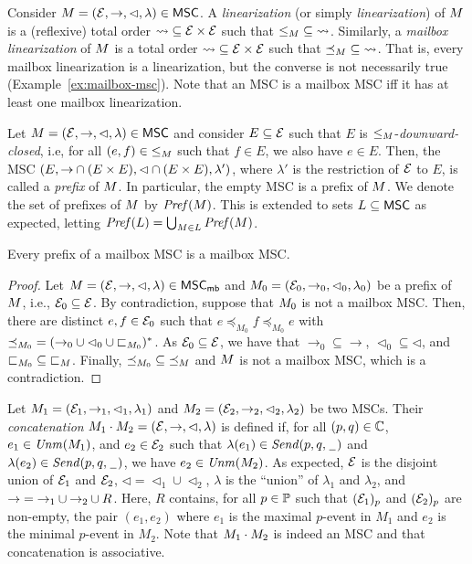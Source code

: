 \documentclass{article}
\begin{document}
Consider $M = (\mathcal{E},\to,\lhd,\lambda) \in \mathsf{MSC}$.
A \emph{\pp linearization} (or simply \emph{linearization}) of $M$ is a (reflexive) total order
${\rightsquigarrow} \subseteq \mathcal{E} \times \mathcal{E}$ such that ${\le_M} \subseteq
{\rightsquigarrow}$. Similarly,
a \emph{mailbox linearization} of $M$ is a total order
${\rightsquigarrow} \subseteq \mathcal{E} \times \mathcal{E}$ such that ${\preceq_M} \subseteq
{\rightsquigarrow}$. That is, every mailbox linearization is a \pp linearization,
but the converse is not necessarily true (Example~\ref{ex:mailbox-msc}).
Note that an MSC is a mailbox MSC iff it has at least one mailbox linearization.

\medskip

Let $M = (\mathcal{E},\to,\lhd,\lambda) \in \mathsf{MSC}$ and consider
$E \subseteq \mathcal{E}$ such that $E$ is ${\le_M}$-\emph{downward-closed}, i.e,
for all $(e,f) \in {\le_M}$ such that $f \in E$, we also have $e \in E$.
Then, the MSC $(E,{\to} \cap (E \times E),{\lhd} \cap (E \times E),\lambda')$,
where $\lambda'$ is the restriction of $\mathcal{E}$ to $E$, is called a \emph{prefix}
of $M$. In particular, the empty MSC is a prefix of $M$.
We denote the set of prefixes of $M$ by $\mathit{Pref}(M)$.
This is extended to sets $L \subseteq \mathsf{MSC}$ as expected, letting
$\mathit{Pref}(L) = \bigcup_{M \in L} \mathit{Pref}(M)$.

\begin{lemma}
\label{lem:mb-prefix}
Every prefix of a mailbox MSC is a mailbox MSC.
\end{lemma}
\begin{proof}
Let $M = (\mathcal{E}, \to, \lhd, \lambda) \in \mathsf{MSC}_{\mathsf{mb}}$ and $M_0 =
(\mathcal{E}_0, \to_0, \lhd_0, \lambda_0)$ be a prefix of $M$, i.e.,
$\mathcal{E}_0 \subseteq \mathcal{E}$. By contradiction, suppose that $M_0$ is not a
mailbox MSC. Then, there are distinct $e,f \in \mathcal{E}_0$ such that $e \preceq_{M_0} f \preceq_{M_0}
e$ with ${\preceq_{M_0}} = ({\rightarrow_0} \cup {\lhd_0} \cup {\sqsubset_{M_0}})^*$.
As $\mathcal{E}_0 \subseteq \mathcal{E}$, we have that ${\rightarrow_0} \subseteq {\rightarrow}$, ${\lhd_0} \subseteq {\lhd}$, and ${\sqsubset_{M_0}} \subseteq {\sqsubset_{M}}$. Finally, ${\preceq_{M_0}} \subseteq {\preceq_{M}}$ and $M$ is not a mailbox MSC, which is a contradiction.
\end{proof}

Let $M_1 = (\mathcal{E}_1,\to_1,\lhd_1,\lambda_1)$ and
$M_2 = (\mathcal{E}_2,\to_2,\lhd_2,\lambda_2)$ be two MSCs.
Their \emph{concatenation} $M_1 \cdot M_2 = (\mathcal{E},\to,\lhd,\lambda)$ is defined if, for all $(p,q) \in \mathbb{C}$,
$e_1 \in \mathit{Unm}(M_1)$, and
$e_2 \in \mathcal{E}_2$ such that $\lambda(e_1) \in {\mathit{Send}(p,q,\hspace{0.1em}\underline{\hspace{0.5em}}\hspace{0.1em})}$
and $\lambda(e_2) \in {\mathit{Send}(p,q,\hspace{0.1em}\underline{\hspace{0.5em}}\hspace{0.1em})}$,
we have $e_2 \in \mathit{Unm}(M_2)$.
As expected, $\mathcal{E}$ is the disjoint union of $\mathcal{E}_1$ and $\mathcal{E}_2$,
${\lhd}  = {\lhd_1} \cup {\lhd_2}$, $\lambda$ is the ``union'' of $\lambda_1$
and $\lambda_2$, and ${\to} = {\to_1} \cup {\to_2} \cup R$.
Here, $R$ contains, for all $p \in \mathbb{P}$ such that $(\mathcal{E}_1)_p$ and
$(\mathcal{E}_2)_p$ are non-empty, the pair $(e_1,e_2)$ where $e_1$ is the
maximal $p$-event in $M_1$ and $e_2$ is the minimal $p$-event in $M_2$.
Note that $M_1 \cdot M_2$ is indeed an MSC and that
concatenation is associative.
\end{document}
